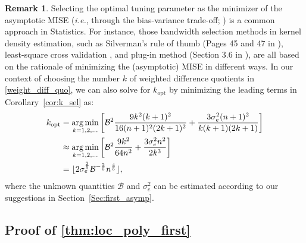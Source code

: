\documentclass{uwstat572}
\theoremstyle{definition}
\newtheorem{Remark}{Remark}
\DeclareMathOperator*{\argmin}{arg\,min}
\DeclarePairedDelimiter\floor{\lfloor}{\rfloor}
\theoremstyle{theorem}
\begin{document}
\begin{Remark}
Selecting the optimal tuning parameter as the minimizer of the asymptotic MISE (\emph{i.e.}, through the bias-variance trade-off; \citealt{wasserman2006all}) is a common approach in Statistics. For instance, those bandwidth selection methods in kernel density estimation, such as Silverman's rule of thumb (Pages 45 and 47 in \citealt{silverman1986density}), least-square cross validation \citep{hall1983large}, and plug-in method (Section 3.6 in \citealt{wand1994kernel}), are all based on the rationale of minimizing the (asymptotic) MISE in different ways. In our context of choosing the number $k$ of weighted difference quotients in \eqref{weight_diff_quo}, we can also solve for $k_{\text{opt}}$ by minimizing the leading terms in Corollary~\ref{cor:k_sel} as:
\begin{align*}
k_{\text{opt}} &= \argmin_{k=1,2,...} \left[\mathcal{B}^2\frac{9k^2(k+1)^2}{16(n+1)^2(2k+1)^2} + \frac{3\sigma_e^2 (n+1)^2}{k(k+1)(2k+1)} \right] \\
&\approx \argmin_{k=1,2,...} \left[\mathcal{B}^2\frac{9k^2}{64n^2} + \frac{3\sigma_e^2 n^2}{2k^3} \right]\\
&= \floor{2 \sigma_e^{\frac{2}{5}} \mathcal{B}^{-\frac{2}{5}} n^{\frac{4}{5}}},
\end{align*}
where the unknown quantities $\mathcal{B}$ and $\sigma_e^2$ can be estimated according to our suggestions in Section~\ref{Sec:first_asymp}.
\end{Remark}

\subsection{Proof of \autoref{thm:loc_poly_first}}
\label{App:proof_thm3}
\end{document}

